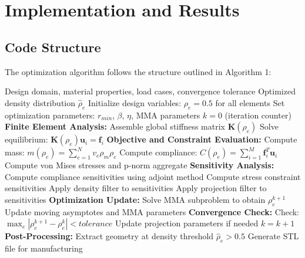 \documentclass[11pt]{report}
\newcommand{\vect}[1]{\boldsymbol{#1}}
\newcommand{\matr}[1]{\mathbf{#1}}
\newcommand{\rhoe}{\rho_e}
\newcommand{\loadvect}{\vect{f}}
\newcommand{\dispvect}{\vect{u}}
\newcommand{\stiffmat}{\matr{K}}
\newcommand{\compliance}{C}
\newcommand{\mass}{m}
\begin{document}
\chapter{Implementation and Results}

\section{Code Structure}
The optimization algorithm follows the structure outlined in Algorithm 1:
\begin{algorithm}
\caption{Topology Optimization Algorithm}
\label{alg:topopt}
\begin{algorithmic}[1]
\Require Design domain, material properties, load cases, convergence tolerance
\Ensure Optimized density distribution $\hat{\rho}_e$
\State Initialize design variables: $\rhoe = 0.5$ for all elements
\State Set optimization parameters: $r_{min}$, $\beta$, $\eta$, MMA parameters
\State $k = 0$ (iteration counter)
    \State \textbf{Finite Element Analysis:}
        \State Assemble global stiffness matrix $\stiffmat(\rhoe)$
        \State Solve equilibrium: $\stiffmat(\rhoe) \dispvect_i = \loadvect_i$
    \EndFor
    \State \textbf{Objective and Constraint Evaluation:}
    \State Compute mass: $\mass(\rhoe) = \sum_{e=1}^{N} v_e \rho_m \rhoe$
    \State Compute compliance: $\compliance(\rhoe) = \sum_{i=1}^{M} \loadvect_i^T \dispvect_i$
    \State Compute von Mises stresses and p-norm aggregate
    \State \textbf{Sensitivity Analysis:}
    \State Compute compliance sensitivities using adjoint method
    \State Compute stress constraint sensitivities
    \State Apply density filter to sensitivities
    \State Apply projection filter to sensitivities
    \State \textbf{Optimization Update:}
    \State Solve MMA subproblem to obtain $\rhoe^{k+1}$
    \State Update moving asymptotes and MMA parameters
    \State \textbf{Convergence Check:}
    \State Check: $\max_e |\rhoe^{k+1} - \rhoe^k| < tolerance$
    \State Update projection parameters if needed
    \State $k = k + 1$
\EndWhile
\State \textbf{Post-Processing:}
\State Extract geometry at density threshold $\hat{\rho}_e > 0.5$
\State Generate STL file for manufacturing
\end{algorithmic}
\end{algorithm}
\end{document}

